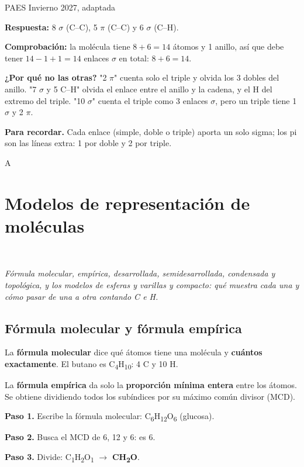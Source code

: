 \begin{elejemplo}{PAES Invierno 2027, adaptada}
{ 

\textbf{Respuesta:} 8 $\sigma$ (C--C), 5 $\pi$ (C--C) y 6 $\sigma$ (C--H).

 

\textbf{Comprobación:} la molécula tiene $8 + 6 = 14$ átomos y 1 anillo, así que debe tener $14 - 1 + 1 = 14$ enlaces $\sigma$ en total: $8 + 6 = 14$. 

 

\textbf{¿Por qué no las otras?} "2 $\pi$" cuenta solo el triple y olvida los 3 dobles del anillo. "7 $\sigma$ y 5 C--H" olvida el enlace entre el anillo y la cadena, y el H del extremo del triple. "10 $\sigma$" cuenta el triple como 3 enlaces $\sigma$, pero un triple tiene 1 $\sigma$ y 2 $\pi$.

\textbf{\color{cienciaD}Para recordar.} Cada enlace (simple, doble o triple) aporta un solo sigma; los pi son las líneas extra: 1 por doble y 2 por triple.}{A}
\end{elejemplo}

\section[Modelos de representación de moléculas]{Modelos de representación de moléculas}
\modcomun\ \ {\color{gris}\itshape Fórmula molecular, empírica, desarrollada, semidesarrollada, condensada y topológica, y los modelos de esferas y varillas y compacto: qué muestra cada una y cómo pasar de una a otra contando C e H.\par}
\subsection{Fórmula molecular y fórmula empírica}
La \textbf{fórmula molecular} dice qué átomos tiene una molécula y \textbf{cuántos exactamente}. El butano es C\textsubscript{4}H\textsubscript{10}: 4 C y 10 H.

 

La \textbf{fórmula empírica} da solo la \textbf{proporción mínima entera} entre los átomos. Se obtiene dividiendo todos los subíndices por su máximo común divisor (MCD).

 

\textbf{Paso 1.} Escribe la fórmula molecular: C\textsubscript{6}H\textsubscript{12}O\textsubscript{6} (glucosa).\par \textbf{Paso 2.} Busca el MCD de 6, 12 y 6: es 6.\par \textbf{Paso 3.} Divide: C\textsubscript{1}H\textsubscript{2}O\textsubscript{1} \ensuremath{\rightarrow} \textbf{CH\textsubscript{2}O}.

